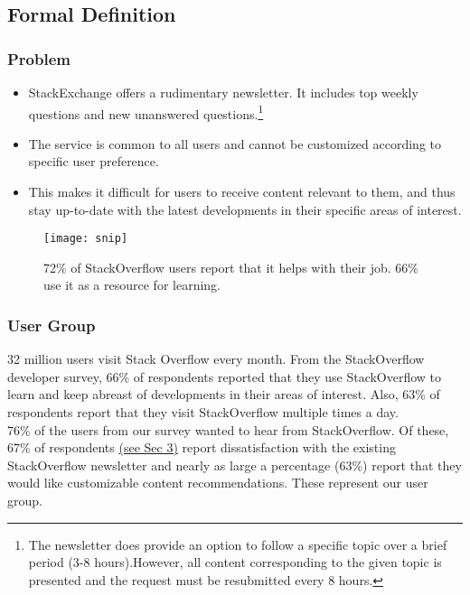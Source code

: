 \documentclass{sig-alternate-05-2015}
\begin{document}
\subsection{Formal Definition}

\subsubsection{Problem}
\label{this}
\begin{itemize}

\item StackExchange offers a rudimentary newsletter. It includes top weekly questions and new unanswered questions.\footnote{The newsletter does provide an option to follow a specific topic over a brief period (3-8 hours).However, all content corresponding to the given topic is presented and the request must be resubmitted every 8 hours.} 

\item The service is common to all users and cannot be customized according to specific user preference.

\item This makes it difficult for users to receive content relevant to them, and thus stay up-to-date with the latest developments in their specific areas of interest.

\end{itemize}
\begin{figure}
\centering
\texttt{[image: snip]}
\caption{72\% of StackOverflow users report that it helps with their job. 66\% use it as a resource for learning.}
\end{figure}
\subsubsection{User Group}

32 million users visit Stack Overflow every month\cite{12}. From the StackOverflow developer survey\cite{12}, 66\% of respondents reported that they use StackOverflow to learn and keep abreast of developments in their areas of interest. Also, 63\% of respondents report that they visit StackOverflow multiple times a day. \\

76\% of the users from our survey wanted to hear from StackOverflow. Of these, 67\% of respondents \hyperref[sec:hello]{(see Sec 3)} report dissatisfaction with the existing StackOverflow newsletter and nearly as large a percentage (63\%) report that they would like customizable content recommendations. These represent our user group. 
\end{document}
